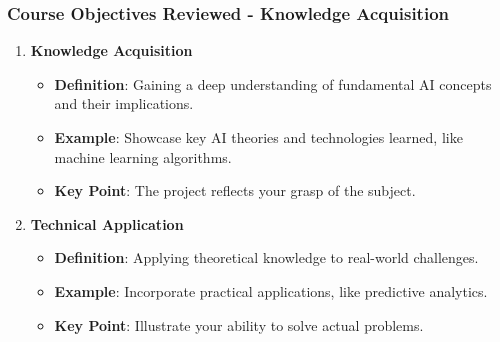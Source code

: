 \documentclass[aspectratio=169]{beamer}
\begin{document}
\begin{frame}[fragile]
    \frametitle{Course Objectives Reviewed - Knowledge Acquisition}
    \begin{enumerate}
        \item \textbf{Knowledge Acquisition}
            \begin{itemize}
                \item \textbf{Definition}: Gaining a deep understanding of fundamental AI concepts and their implications.
                \item \textbf{Example}: Showcase key AI theories and technologies learned, like machine learning algorithms.
                \item \textbf{Key Point}: The project reflects your grasp of the subject.
            \end{itemize}
        
        \item \textbf{Technical Application}
            \begin{itemize}
                \item \textbf{Definition}: Applying theoretical knowledge to real-world challenges.
                \item \textbf{Example}: Incorporate practical applications, like predictive analytics.
                \item \textbf{Key Point}: Illustrate your ability to solve actual problems.
            \end{itemize}
    \end{enumerate}
\end{frame}
\end{document}
